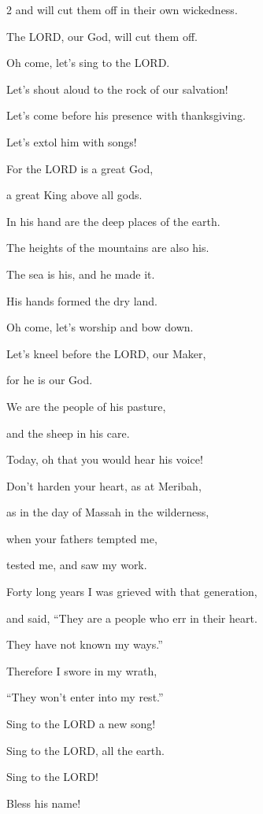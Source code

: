 \begin{multicols}{2}
	and will cut them off in their own wickedness.
	
	The LORD, our God, will cut them off.
	
	
	\mychapter{} \myverse*{}Oh come, let’s sing to the LORD.
	
	\quad\quad Let’s shout aloud to the rock of our salvation!
	
	
	\myverse{}Let’s come before his presence with thanksgiving.
	
	Let’s extol him with songs!
	
	
	\myverse{}For the LORD is a great God,
	
	a great King above all gods.
	
	
	\myverse{}In his hand are the deep places of the earth.
	
	The heights of the mountains are also his.
	
	
	\myverse{}The sea is his, and he made it.
	
	His hands formed the dry land.
	
	
	\myverse{}Oh come, let’s worship and bow down.
	
	Let’s kneel before the LORD, our Maker,
	
	
	\myverse{}for he is our God.
	
	We are the people of his pasture,
	
	and the sheep in his care.
	
	Today, oh that you would hear his voice!
	
	
	\myverse{}Don’t harden your heart, as at Meribah,
	
	as in the day of Massah in the wilderness,
	
	
	\myverse{}when your fathers tempted me,
	
	tested me, and saw my work.
	
	
	\myverse{}Forty long years I was grieved with that generation,
	
	and said, “They are a people who err in their heart.
	
	They have not known my ways.”
	
	
	\myverse{}Therefore I swore in my wrath,
	
	“They won’t enter into my rest.”
	
	
	\mychapter{} \myverse*{}Sing to the LORD a new song!
	
	\quad\quad Sing to the LORD, all the earth.
	
	
	\myverse{}Sing to the LORD!
	
	Bless his name!
	

\end{multicols}
